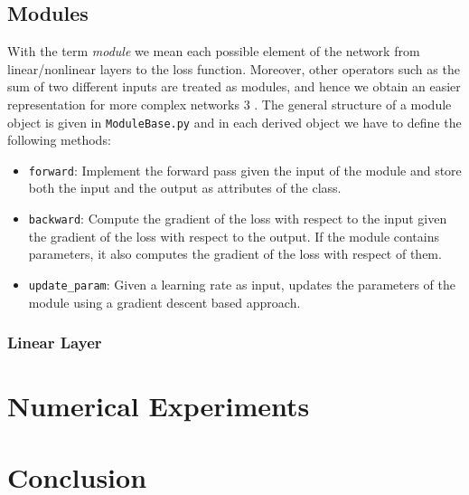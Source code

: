 \documentclass{article}
\begin{document}
\subsection{Modules}
With the term \emph{module} we mean each possible element of the network from linear/nonlinear layers to the loss function. Moreover, other operators such as the sum of two different inputs are treated as modules, and hence we obtain an easier representation for more complex networks 3 .
The general structure of a module object is given in \verb|ModuleBase.py| and in each derived object we have to define the following methods:
\begin{itemize}
\item \verb|forward|: Implement the forward pass given the input of the module and store both the input and the output as attributes of the class. 
\item \verb|backward|: Compute the gradient of the loss with respect to the input given the gradient of the loss with respect to the output. If the module contains parameters, it also computes the gradient of the loss with respect of them.
\item \verb|update_param|: Given a learning rate as input, updates the parameters of the module using a gradient descent based approach.
\end{itemize}
\subsubsection{Linear Layer}




\section{Numerical Experiments}

 \section{Conclusion}\label{sec_conclusion}
 
 

 
  
  
  
\end{document}
